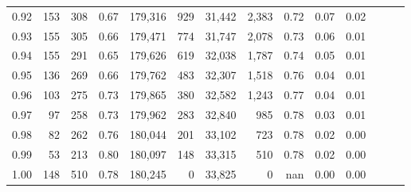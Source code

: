 \begin{tabular}{rrrrrrrrrrrrrr}
0.92 &    153 &  308 &  0.67 &  179,316 &      929 &  31,442 &   2,383 &  0.72 &  0.07 &      0.02 \\
0.93 &    155 &  305 &  0.66 &  179,471 &      774 &  31,747 &   2,078 &  0.73 &  0.06 &      0.01 \\
0.94 &    155 &  291 &  0.65 &  179,626 &      619 &  32,038 &   1,787 &  0.74 &  0.05 &      0.01 \\
0.95 &    136 &  269 &  0.66 &  179,762 &      483 &  32,307 &   1,518 &  0.76 &  0.04 &      0.01 \\
0.96 &    103 &  275 &  0.73 &  179,865 &      380 &  32,582 &   1,243 &  0.77 &  0.04 &      0.01 \\
0.97 &     97 &  258 &  0.73 &  179,962 &      283 &  32,840 &     985 &  0.78 &  0.03 &      0.01 \\
0.98 &     82 &  262 &  0.76 &  180,044 &      201 &  33,102 &     723 &  0.78 &  0.02 &      0.00 \\
0.99 &     53 &  213 &  0.80 &  180,097 &      148 &  33,315 &     510 &  0.78 &  0.02 &      0.00 \\
1.00 &    148 &  510 &  0.78 &  180,245 &        0 &  33,825 &       0 &   nan &  0.00 &      0.00 \\
\bottomrule
\end{tabular}
